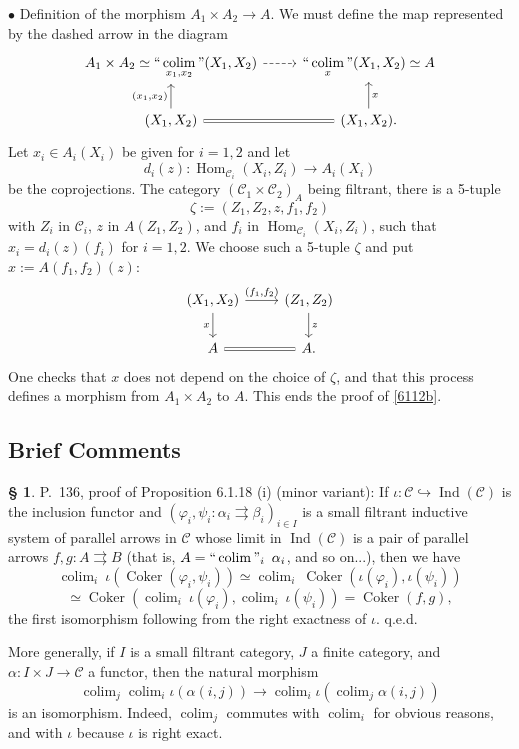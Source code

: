 \documentclass[12pt]{article}
\theoremstyle{remark}
\theoremstyle{definition}
\newtheorem{s}[thm]{\S}
\newcommand{\bu}{\bullet}
\newcommand{\nn}{\noindent}
\newcommand{\C}{\mathcal C}
\newcommand{\mv}{ (minor variant)}
\newcommand{\bc}{\subsection{Brief Comments}}
\newcommand{\parar}{\rightrightarrows}
\DeclareMathOperator*{\coli}{colim}
\DeclareMathOperator*{\co}{colim}
\DeclareMathOperator*{\ic}{``\coli"}
\DeclareMathOperator{\Coker}{Coker}
\DeclareMathOperator{\Hom}{Hom}%
\DeclareMathOperator{\Ind}{Ind}
\begin{document}
\nn$\bu$ Definition of the morphism $A_1\times A_2\to A$. We must define the map represented by the dashed arrow in the diagram  
$$
\begin{tikzcd}
A_1\times A_2\simeq\displaystyle\ic_{x_1,x_2}(X_1,X_2)\ar[dashed]{r}&\displaystyle\ic_x(X_1,X_2)\simeq A\\ 
(X_1,X_2)\ar{u}{(x_1,x_2)}\ar[equal]{r}&(X_1,X_2).\ar{u}[swap]{x}
\end{tikzcd}
$$ 
Let $x_i\in A_i(X_i)$ be given for $i=1,2$ and let
$$
d_i(z):\Hom_{\C_i}(X_i,Z_i)\to A_i(X_i)
$$
be the coprojections. The category $(\C_1\times\C_2)_A$ being filtrant, there is a 5-tuple 
$$
\zeta:=(Z_1,Z_2,z,f_1,f_2)
$$ 
with $Z_i$ in $\C_i$, $z$ in $A(Z_1,Z_2)$, and $f_i$ in $\Hom_{\C_i}(X_i,Z_i)$, such that $x_i=d_i(z)(f_i)$ for $i=1,2$. We choose such a 5-tuple $\zeta$ and put $x:=A(f_1,f_2)(z)$:
$$
\begin{tikzcd}
(X_1,X_2)\ar{d}[swap]{x}\ar{r}{(f_1,f_2)}&(Z_1,Z_2)\ar{d}{z}\\ 
A\ar[equal]{r}&A.
\end{tikzcd}
$$ 
One checks that $x$ does not depend on the choice of $\zeta$, and that this process defines a morphism from $A_1\times A_2$ to $A$. This ends the proof of \eqref{6112b}.
%
%
\bc
%
\begin{s} 
P.~136, proof of Proposition 6.1.18 (i)\mv: If $\iota:\C\hookrightarrow\Ind(\C)$ is the inclusion functor and $(\varphi_i,\psi_i:\alpha_i\parar\beta_i)_{i\in I}$ is a small filtrant inductive system of parallel arrows in $\C$ whose limit in $\Ind(\C)$ is a pair of parallel arrows $f,g:A\parar B$ (that is, $A=\ic_i\ \alpha_i$, and so on...), then we have 
$$
\co_i\ \iota(\Coker(\varphi_i,\psi_i))\simeq
\co_i\ \Coker(\iota(\varphi_i),\iota(\psi_i))
$$
$$
\simeq
\Coker(\co_i\ \iota(\varphi_i),\co_i\ \iota(\psi_i))=
\Coker(f,g),
$$ 
the first isomorphism following from the right exactness of $\iota$. q.e.d.

More generally, if $I$ is a small filtrant category, $J$ a finite category, and $\alpha:I\times J\to\C$ a functor, then the natural morphism 
$$
\co_j\co_i\iota(\alpha(i,j))\to\co_i\iota\left(\co_j\alpha(i,j)\right) 
$$ 
is an isomorphism. Indeed, $\co_j$ commutes with $\co_i$ for obvious reasons, and with $\iota$ because $\iota$ is right exact.
\end{s}
%
%
\end{document}
